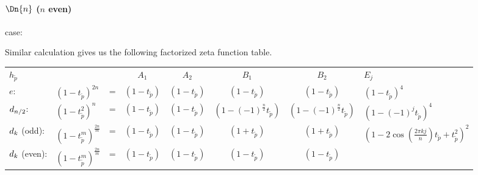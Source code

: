 \paragraph{$\Dn{n}$ ($n$ even)} case:
%

Similar calculation gives us the following
factorized zeta function table.

\vskip 12pt
\begin{center}
  \begin{tabular}{b{1cm}lcccccl}

    $h_{\tilde p}$ &  & &  $A_1$  &  $A_2$  &  $B_1$  &  $B_2$  &  $E_{j}$  \\
    $e$:
                   & $(1-t_{\tilde p} )^{2n}$  &=&$(1-t_{\tilde p})$ & $(1-t_{\tilde p})$ &
                                                                                            $(1-t_{\tilde p})$ &$(1-t_{\tilde p})$&$ (1-t_{\tilde
                                                                                                                                    p})^4 $ \\
    $d_{n/2}$:
                   & $(1-t_{\tilde p}^2 )^n$ &=&  $(1-t_{\tilde p})$ & $(1-t_{\tilde p})$ &
                                                                                            $(1-(-1)^{\frac{n}{2}}t_{\tilde p})$ &$(1-(-1)^{\frac{n}{2}}t_{\tilde p})$ &
                                                                                                                                                                         $(1-(-1)^jt_{\tilde p})^4 $ \\
    $d_{k}$ (odd):
                   & $(1-t_{\tilde p}^m )^{\frac{2n}{m}}$ &=&  $(1-t_{\tilde p})$ & $(1-t_{\tilde p})$ &
                                                                                                         $(1+t_{\tilde p})$ &$(1+t_{\tilde p})$ &
                                                                                                                                                  $ (1-2\cos(\frac{2\pi kj}{n})t_{\tilde p}+t^{2}_{\tilde p})^2 $ \\
    $d_{k}$ (even):
                   & $(1-t_{\tilde p}^m )^{\frac{2n}{m}}$ &=&  $(1-t_{\tilde p})$ & $(1-t_{\tilde p})$ &
                                                                                                         $(1-t_{\tilde p})$ &$(1-t_{\tilde p})$ &

\end{tabular}
\end{center}
